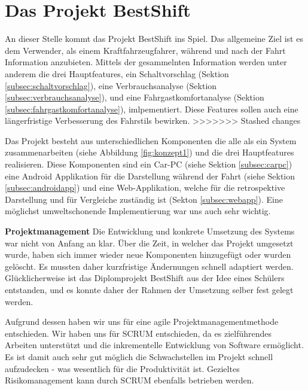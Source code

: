 \section{Das Projekt BestShift}
\label{sec:projektbestshift}

An dieser Stelle kommt das Projekt BestShift ins Spiel. Das allgemeine Ziel ist es dem Verwender, als einem Kraftfahrzeugfahrer, während und nach der Fahrt Information anzubieten. Mittels der gesammelnten Information werden unter anderem die drei Hauptfeatures, ein Schaltvorschlag (Sektion \ref{subsec:schaltvorschlag}), eine Verbrauchsanalyse (Sektion \ref{subsec:verbrauchsanalyse}), und eine Fahrgastkomfortanalyse (Sektion \ref{subsec:fahrgastkomfortanalyse}), imlpementiert. Diese Features sollen auch eine längerfristige Verbesserung des Fahrstils bewirken.
>>>>>>> Stashed changes

Das Projekt besteht aus unterschiedlichen Komponenten die alle als ein System zusammenarbeiten (siehe Abbildung \ref{fig:konzept1}) und die drei Hauptfeatures realisieren. Diese Komponenten sind ein Car-PC (siehe Sektion \ref{subsec:carpc}) eine Android Applikation für die Darstellung während der Fahrt (siehe Sektion \ref{subsec:androidapp}) und eine Web-Applikation, welche für die retrospektive Darstellung und für Vergleiche zuständig ist (Sekton \ref{subsec:webapp}). Eine möglichst umweltschonende Implementierung war uns auch sehr wichtig.

\textbf{Projektmanagement\newline}
Die Entwicklung und konkrete Umsetzung des Systems war nicht von Anfang an klar. Über die Zeit, in welcher das Projekt umgesetzt wurde, haben sich immer wieder neue Komponenten hinzugefügt oder wurden gelöscht. Es mussten daher kurzfristige Ändernungen schnell adaptiert werden. Glücklicherweise ist das Diplomprojekt BestShift aus der Idee eines Schülers entstanden, und es konnte daher der Rahmen der Umsetzung selber fest gelegt werden.

Aufgrund dessen haben wir uns für eine agile Projektmanagementmethode entschieden. Wir haben uns für SCRUM entschieden, da es zielführendes Arbeiten unterstützt und die inkrementelle Entwicklung von Software ermöglicht. Es ist damit auch sehr gut möglich die Schwachstellen im Projekt schnell aufzudecken - was wesentlich für die Produktivität ist. Gezieltes Risikomanagement kann durch SCRUM ebenfalls betrieben werden. 

